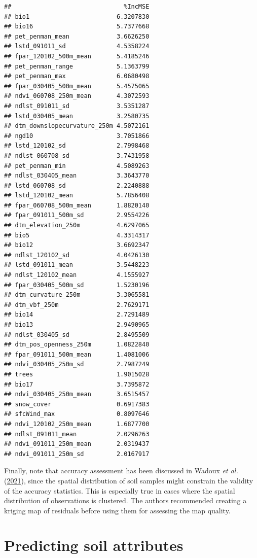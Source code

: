 \documentclass[
  10pt,
  b5paper,
  oneside]{book}
\begin{document}
\begin{verbatim}
##                               %IncMSE
## bio1                        6.3207830
## bio16                       5.7377668
## pet_penman_mean             3.6626250
## lstd_091011_sd              4.5358224
## fpar_120102_500m_mean       5.4185246
## pet_penman_range            5.1363799
## pet_penman_max              6.0680498
## fpar_030405_500m_mean       5.4575065
## ndvi_060708_250m_mean       4.3072593
## ndlst_091011_sd             3.5351287
## lstd_030405_mean            3.2580735
## dtm_downslopecurvature_250m 4.5072161
## ngd10                       3.7051866
## lstd_120102_sd              2.7998468
## ndlst_060708_sd             3.7431958
## pet_penman_min              4.5089263
## ndlst_030405_mean           3.3643770
## lstd_060708_sd              2.2240888
## lstd_120102_mean            5.7856408
## fpar_060708_500m_mean       1.8820140
## fpar_091011_500m_sd         2.9554226
## dtm_elevation_250m          4.6297065
## bio5                        4.3314317
## bio12                       3.6692347
## ndlst_120102_sd             4.0426130
## lstd_091011_mean            3.5448223
## ndlst_120102_mean           4.1555927
## fpar_030405_500m_sd         1.5230196
## dtm_curvature_250m          3.3065581
## dtm_vbf_250m                2.7629171
## bio14                       2.7291489
## bio13                       2.9490965
## ndlst_030405_sd             2.8495509
## dtm_pos_openness_250m       1.0822840
## fpar_091011_500m_mean       1.4081006
## ndvi_030405_250m_sd         2.7987249
## trees                       1.9015028
## bio17                       3.7395872
## ndvi_030405_250m_mean       3.6515457
## snow_cover                  0.6917383
## sfcWind_max                 0.8097646
## ndvi_120102_250m_mean       1.6877700
## ndlst_091011_mean           2.0296263
## ndvi_091011_250m_mean       2.0319437
## ndvi_091011_250m_sd         2.0167917
\end{verbatim}

Finally, note that accuracy assessment has been discussed in Wadoux \emph{et al.} (\protect\hyperlink{ref-Wadoux2021}{2021}), since the spatial distribution of soil samples might constrain the validity of the accuracy statistics. This is especially true in cases where the spatial distribution of observations is clustered. The authors recommended creating a kriging map of residuals before using them for assessing the map quality.

\hypertarget{predicting-soil-attributes}{%
\section{Predicting soil attributes}\label{predicting-soil-attributes}}
\end{document}
